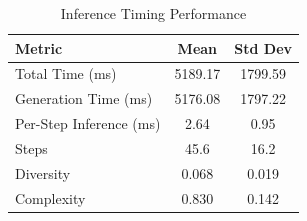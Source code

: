\begin{table}[t]
\centering
\caption{Inference Timing Performance}
\label{tab:inference_timing}
\begin{tabular}{lcc}
\hline
Metric & Mean & Std Dev \\
\hline
Total Time (ms) & 5189.17 & 1799.59 \\
Generation Time (ms) & 5176.08 & 1797.22 \\
Per-Step Inference (ms) & 2.64 & 0.95 \\
Steps & 45.6 & 16.2 \\
Diversity & 0.068 & 0.019 \\
Complexity & 0.830 & 0.142 \\
\hline
\end{tabular}
\end{table}

